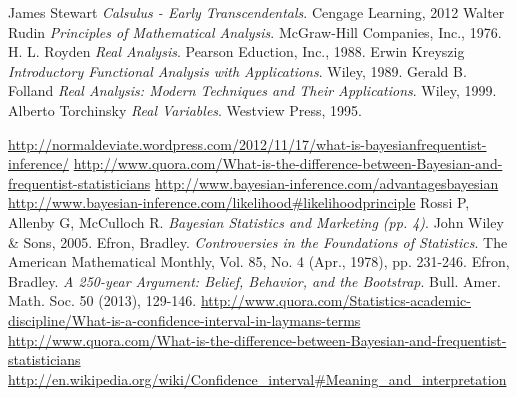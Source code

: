 \documentclass{book}
\begin{document}
\begin{thebibliography}{100} %
 James Stewart {\em{Calsulus - Early Transcendentals}}. Cengage Learning, 2012
 Walter Rudin {\em{Principles of Mathematical Analysis}}. McGraw-Hill Companies, Inc., 1976.
 H. L. Royden {\em{Real Analysis}}. Pearson Eduction, Inc., 1988.
 Erwin Kreyszig {\em{Introductory Functional Analysis with Applications}}. Wiley, 1989.
 Gerald B. Folland {\em{Real Analysis: Modern Techniques and Their Applications}}. Wiley, 1999.
 Alberto Torchinsky {\em{Real Variables}}. Westview Press, 1995.

 {\url{http://normaldeviate.wordpress.com/2012/11/17/what-is-bayesianfrequentist-inference/}}
 {\url{http://www.quora.com/What-is-the-difference-between-Bayesian-and-frequentist-statisticians}}
 {\url{http://www.bayesian-inference.com/advantagesbayesian}}
 {\url{http://www.bayesian-inference.com/likelihood#likelihoodprinciple}}
 Rossi P, Allenby G, McCulloch R. {\emph{Bayesian Statistics and Marketing (pp. 4)}}. John Wiley \& Sons, 2005.
 Efron, Bradley. {\emph{Controversies in the Foundations of Statistics}}. The American Mathematical Monthly, Vol. 85, No. 4 (Apr., 1978), pp. 231-246.
 Efron, Bradley. {\emph{A 250-year Argument: Belief, Behavior, and the Bootstrap}}. Bull. Amer. Math. Soc. 50 (2013), 129-146.
 {\url{http://www.quora.com/Statistics-academic-discipline/What-is-a-confidence-interval-in-laymans-terms}}
 {\url{http://www.quora.com/What-is-the-difference-between-Bayesian-and-frequentist-statisticians}}
 {\url{http://en.wikipedia.org/wiki/Confidence_interval#Meaning_and_interpretation}}


\end{thebibliography}
\end{document}
